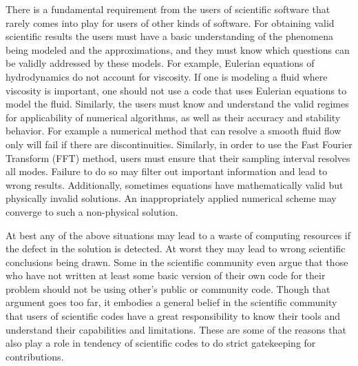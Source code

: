 \label{sec:using}
There is a fundamental requirement from the users of scientific
software that rarely comes into play for users of other kinds of
software. For obtaining valid scientific results the users must 
have a basic understanding of the phenomena being modeled and the
approximations, and they must know which questions can be validly 
addressed by these models. For example, Eulerian equations of
hydrodynamics do not account for viscosity. If one is modeling a fluid
where viscosity is important, one should not use a code that uses
Eulerian equations to model the fluid. Similarly, the users must know and
understand the valid regimes for applicability of numerical
algorithms, as well as their accuracy and stability behavior. For
example a numerical method that can resolve a smooth 
fluid flow only will fail if there are discontinuities. Similarly, in
order to use the Fast Fourier Transform (FFT) method, users must
ensure that their sampling interval resolves all modes. Failure to do
so may filter out important information and lead to wrong results.
Additionally, sometimes equations have mathematically valid but
physically invalid solutions. An inappropriately applied numerical scheme may
converge to such a non-physical solution. 

At best any of the above
situations may lead to a waste of computing resources if the defect in
the solution is detected. At worst they may lead to wrong scientific
conclusions being drawn. Some in the scientific community even argue
that those who have not written at least some basic version of their
own code for their problem should not be using other's public or
community code. Though that argument goes too far, it embodies a
general belief in the scientific community that users of scientific
codes have a great responsibility to know their tools and understand
their capabilities and limitations. 
These are some of the reasons that also play a role in tendency of scientific
codes to do strict gatekeeping for contributions.

